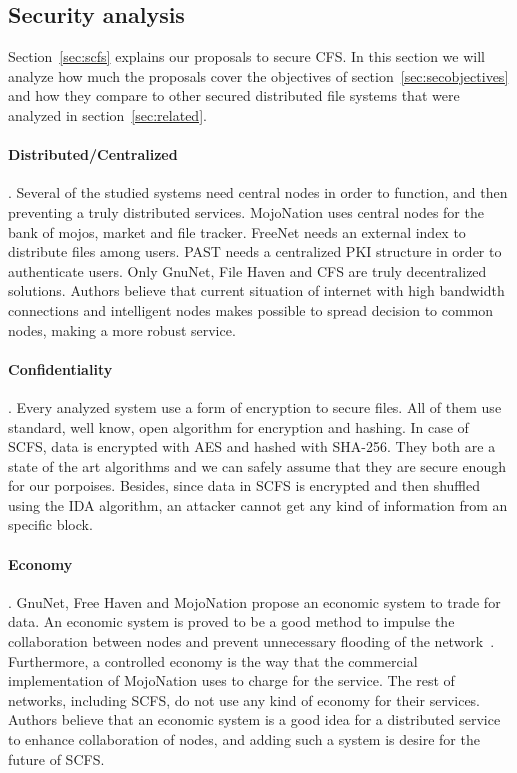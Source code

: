 \documentclass{llncs}
\begin{document}
\subsection{Security analysis}
\label{sec:comparision}

Section~\ref{sec:scfs} explains our proposals to secure CFS. In this section we will analyze how much the proposals cover the objectives of section~\ref{sec:secobjectives} and how they compare to other secured distributed file systems that were analyzed in section~\ref{sec:related}.

\paragraph{Distributed/Centralized}. Several of the studied systems need central nodes in order to function, and then preventing a truly distributed services. MojoNation uses central nodes for the bank of mojos, market and file tracker. FreeNet needs an external index to distribute files among users. PAST needs a centralized PKI structure in order to authenticate users. Only GnuNet, File Haven and CFS are truly decentralized solutions. Authors believe that current situation of internet with high bandwidth connections and intelligent nodes makes possible to spread decision to common nodes, making a more robust service.

\paragraph{Confidentiality}. Every analyzed system use a form of encryption to secure files. All of them use standard, well know, open algorithm for encryption and hashing. In case of SCFS, data is encrypted with AES and hashed with SHA-256. They both are a state of the art algorithms and we can safely assume that they are secure enough for our porpoises. Besides, since data in SCFS is encrypted and then shuffled using the IDA algorithm, an attacker cannot get any kind of information from an specific block.

\paragraph{Economy}. GnuNet, Free Haven and MojoNation propose an economic system to trade for data. An economic system is proved to be a good method to impulse the collaboration between nodes and prevent unnecessary flooding of the network~\cite{GNUNET}. Furthermore, a controlled economy is the way that the commercial implementation of MojoNation uses to charge for the service. The rest of networks, including SCFS, do not use any kind of economy for their services. Authors believe that an economic system is a good idea for a distributed service to enhance collaboration of nodes, and adding such a system is desire for the future of SCFS.
\end{document}
